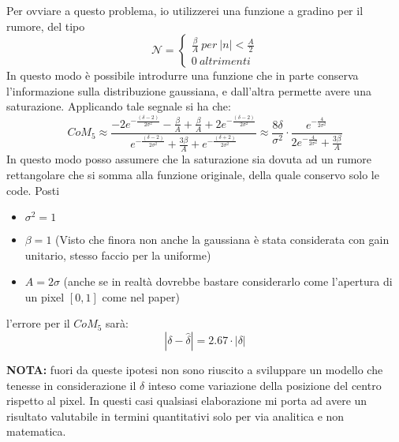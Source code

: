 Per ovviare a questo problema, io utilizzerei una funzione a gradino per il rumore, del tipo
\begin{equation*}
  \mathcal{N} = \left\{
    \begin{matrix}
      \frac{\beta}{A} \ per \ |n| < \frac{A}{2}\\ 
      0 \ altrimenti
    \end{matrix}
  \right.
\end{equation*}
In questo modo è possibile introdurre una funzione che in parte conserva l'informazione sulla distribuzione gaussiana, e dall'altra permette avere una saturazione. Applicando tale segnale si ha che:
\begin{equation}
  CoM_5 \approx
  \frac{
    -2e^{-\frac{(\delta-2)}{2\sigma^2}} - \frac{\beta}{A} + \frac{\beta}{A} + 2e^{-\frac{(\delta-2)}{2\sigma^2}}
  }{
    e^{-\frac{(\delta-2)}{2\sigma^2}} + \frac{3\beta}{A} + e^{-\frac{(\delta+2)}{2\sigma^2}}
  } \approx
  \frac{8\delta}{\sigma^2} \cdot \frac{
    e^{-\frac{4}{2\sigma^2}}
  }{
    2e^{-\frac{4}{2\sigma^2}} + \frac{3\beta}{A}
  }
\end{equation}
In questo modo posso assumere che la saturazione sia dovuta ad un rumore rettangolare che si somma alla funzione originale, della quale conservo solo le code. Posti
\begin{itemize}
  \item $\sigma^2 = 1$
  \item $\beta = 1$ (Visto che finora non anche la gaussiana è stata considerata con gain unitario, stesso faccio per la uniforme)
  \item $A = 2\sigma$ (anche se in realtà dovrebbe bastare considerarlo come l'apertura di un pixel $[0,1]$ come nel paper)
\end{itemize}
l'errore per il $CoM_5$ sarà:
\begin{equation}
  |\delta - \hat{\delta}| = 2.67 \cdot |\delta|
\end{equation}

\noindent
\textbf{NOTA:} fuori da queste ipotesi non sono riuscito a sviluppare un modello che tenesse in considerazione il $\delta$ inteso come variazione della posizione del centro rispetto al pixel. In questi casi qualsiasi elaborazione mi porta ad avere un risultato valutabile in termini quantitativi solo per via analitica e non matematica.


